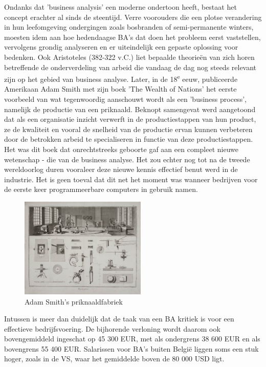 \documentclass{hogent-article}
\begin{document}
Ondanks dat 'business analysis' een moderne ondertoon heeft, bestaat het concept erachter al 
sinds de steentijd. Verre voorouders die een plotse verandering in hun leefomgeving ondergingen 
zoals bosbranden of semi-permanente winters, moesten idem aan hoe hedendaagse BA's dat doen 
het probleem eerst vaststellen, vervolgens grondig analyseren en er uiteindelijk een gepaste 
oplossing voor bedenken. Ook Aristoteles (382-322 v.C.) liet bepaalde theorieën 
van zich horen betreffende de onderverdeling van arbeid die vandaag de dag nog steeds relevant 
zijn op het gebied van business analyse. Later, in de 18\textsuperscript{e} eeuw, publiceerde 
Amerikaan Adam Smith met zijn boek 'The Wealth of Nations' het eerste voorbeeld van 
wat tegenwoordig aanschouwt wordt als een 'business process', namelijk de productie van 
een priknaald. Beknopt samengevat werd aangetoond dat als een organisatie inzicht verwerft 
in de productiestappen van hun product, ze de kwaliteit en vooral de snelheid van de 
productie ervan kunnen verbeteren door de betrokken arbeid te specialiseren in functie
van deze productiestappen. Het was dit boek dat onrechtstreeks geboorte gaf aan een compleet 
nieuwe wetenschap - die van de business analyse. Het zou echter nog tot na de tweede 
wereldoorlog duren vooraleer deze nieuwe kennis effectief benut werd in de industrie. 
Het is geen toeval dat dit net het moment was wanneer bedrijven voor de eerste keer 
programmeerbare computers in gebruik namen. \autocite{bang}
\begin{figure}[!ht]
  \centering
  \includegraphics[width=6cm]{./img/adamsmith.jpg}
  \setlength{\abovecaptionskip}{0.5cm}
  \caption{Adam Smith's priknaaldfabriek}
\end{figure}

Intussen is meer dan duidelijk dat de taak van een BA kritiek is voor een effectieve
bedrijfsvoering. De bijhorende verloning wordt daarom ook bovengemiddeld ingeschat op
45 300 EUR, met als ondergrens 38 600 EUR en als bovengrens 55 400 EUR. Salarissen voor 
BA's buiten België liggen soms een stuk hoger, zoals in de VS, waar het 
gemiddelde boven de 80 000 USD ligt. \autocite{step} \autocite{howmuch}
\end{document}
